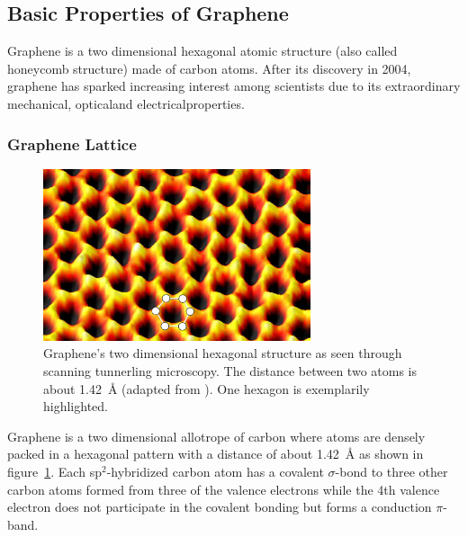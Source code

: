 \subsection{Basic Properties of Graphene}

Graphene is a two dimensional hexagonal atomic structure (also called honeycomb structure) made of carbon atoms. After its discovery in 2004\cite{novoselov}, graphene has sparked increasing interest among scientists due to its extraordinary mechanical\mcite, optical\mcite and electrical\mcite properties. 

\subsubsection{Graphene Lattice}
\begin{figure}[!h]
  \centering
  \includegraphics[width=0.7\textwidth]{./images/graphene-spm.png}
  \caption{Graphene's two dimensional hexagonal structure as seen through scanning tunnerling microscopy. The distance between two atoms is about \SI{1.42}{\angstrom} (adapted from \mcite). One hexagon is exemplarily highlighted.}
  \label{fig:spm}
\end{figure}

Graphene is a two dimensional allotrope of carbon where atoms are densely packed in a hexagonal pattern with a distance of about \SI{1.42}{\angstrom} as shown in figure~\ref{fig:spm}. Each sp$^2$-hybridized carbon atom has a covalent $\sigma$-bond to three other carbon atoms formed from three of the valence electrons while the 4th valence electron does not participate in the covalent bonding but forms a conduction $\pi$-band.

